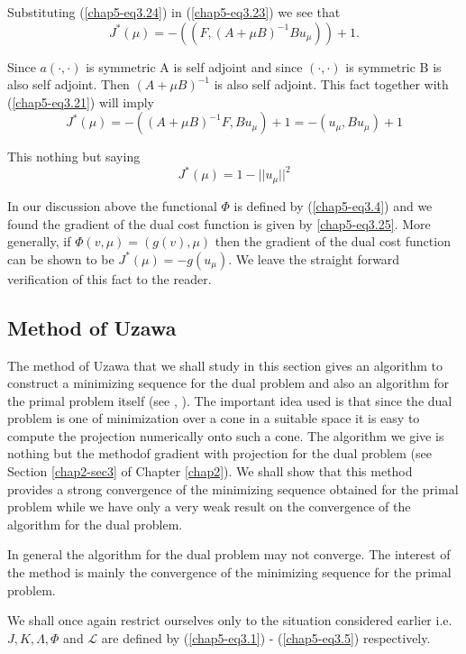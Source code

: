 Substituting (\ref{chap5-eq3.24}) in (\ref{chap5-eq3.23}) we see that
$$
J^{*} (\mu) = - ((F, (A + \mu B)^{-1} B u_{\mu})) + 1.
$$

Since $a(\cdot , \cdot)$ is symmetric A is self adjoint and since $(\cdot , \cdot)$ is symmetric B is also self adjoint. Then $(A + \mu B)^{-1}$ is also self adjoint. This fact together with (\ref{chap5-eq3.21}) will imply
$$
J^{*} (\mu) = - ((A+\mu B)^{-1} F, Bu_{\mu}) + 1 = -(u_{\mu}, Bu_{\mu}) + 1
$$

This nothing but saying
\begin{equation*}
J^{*} (\mu)= 1 - ||u_{\mu}||^{2}\tag{3.25}\label{chap5-eq3.25}
\end{equation*}

\begin{remark}\label{chap5-rem3.2}
In our discussion above the functional $\Phi$ is defined by (\ref{chap5-eq3.4}) and we found the gradient of the dual cost function is given by \ref{chap5-eq3.25}. More generally, if $\Phi(v, \mu) = (g(v), \mu)$ then the gradient of the dual cost function can be shown to be $J^{*} (\mu) = -g(u_{\mu})$. We leave the straight forward verification of this fact to the reader.
\end{remark}

\subsection{Method of Uzawa}\label{chap5-subsec3.3}

The method of Uzawa that we shall study in this section gives an algorithm to construct a minimizing sequence for the dual problem and also an algorithm for the primal problem itself (see \cite{key6}, \cite{key49}). The important idea used is that since the dual problem is one of minimization over a cone in a suitable space it is easy to compute the projection numerically onto such a cone. The algorithm we give is nothing but the method\pageoriginale of gradient with projection for the dual problem (see Section \ref{chap2-sec3} of Chapter \ref{chap2}). We shall show that this method provides a strong convergence of the minimizing sequence obtained for the primal problem while we have only a very weak result on the convergence of the algorithm for the dual problem.

In general the algorithm for the dual problem may not converge. The interest of the method is mainly the convergence of the minimizing sequence for the primal problem.

We shall once again restrict ourselves only to the situation considered earlier i.e. $J, K, \Lambda, \Phi$ and $\mathscr{L}$ are defined by (\ref{chap5-eq3.1}) - (\ref{chap5-eq3.5}) respectively.

